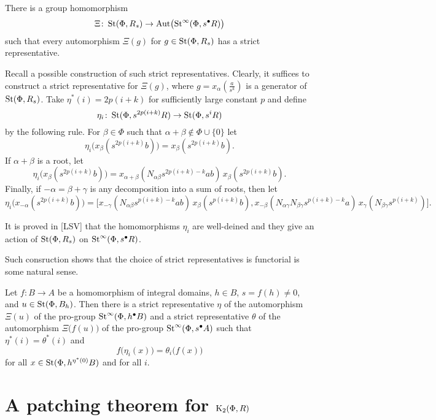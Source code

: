 \documentclass[oneside, 11pt]{amsart}
\begin{document}
\begin{theorem}[Voronetsky]
\label{vor}
There is a group homomorphism 
$$
\Xi \colon \mathop{\mathrm{St}}\nolimits(\Phi, R_s) \to \mathrm{Aut}\bigl(\mathop{\mathrm{St}}\nolimits^\infty(\Phi, s^\bullet R)\bigr)
$$
such that every automorphism $\Xi(g)$ for $g \in \mathop{\mathrm{St}}\nolimits(\Phi, R_s)$ has a strict representative.
\end{theorem}

Recall a possible construction of such strict representatives. Clearly, it suffices to construct a strict representative for \(\Xi(g)\), where $g = x_\alpha(\frac a {s^k})$ is a generator of $\mathop{\mathrm{St}}\nolimits(\Phi, R_s)$. Take $\eta^*(i) = 2p(i + k)$ for sufficiently large constant \(p\) and define
$$
\eta_i \colon \mathop{\mathrm{St}}\nolimits(\Phi, s^{2p(i + k)} R) \to \mathop{\mathrm{St}}\nolimits(\Phi, s^i R)
$$
by the following rule. For $\beta \in \Phi$ such that \(\alpha + \beta \notin \Phi \cup \{0\}\) let 
$$\eta_i \bigl(x_\beta(s^{2p(i + k)} b)\bigr) = x_\beta(s^{2p(i + k)}b).$$
If $\alpha + \beta$ is a root, let
$$
\eta_i\bigl(x_\beta(s^{2p(i + k)} b)\bigr) = x_{\alpha + \beta}(N_{\alpha \beta} s^{2p(i + k) - k} ab)\, x_\beta(s^{2p(i + k)} b).
$$
Finally, if $-\alpha = \beta + \gamma$ is any decomposition into a sum of roots, then let
$$
\eta_i\bigl(x_{-\alpha}(s^{2p(i + k)} b)\bigr) = \bigl[x_{-\gamma}(N_{\alpha\beta} s^{p(i + k) - k} ab)\,
x_\beta(s^{p(i + k)} b),
x_{-\beta}(N_{\alpha\gamma} N_{\beta\gamma} s^{p(i + k) - k} a)\,
x_\gamma(N_{\beta \gamma} s^{p(i + k)})\bigr].
$$

It is proved in [LSV] that the homomorphisms $\eta_i$ are well-deined and they give an action of $\mathop{\mathrm{St}}\nolimits(\Phi, R_s)$ on $\mathop{\mathrm{St}}\nolimits^\infty(\Phi, s^\bullet R)$.

Such consruction shows that the choice of strict representatives is functorial is some natural sense. 
\begin{corollary}
\label{vorcor}
Let $f \colon B \to A$ be a homomorphism of integral domains, $h \in B$, $s = f(h) \neq 0$, and $u \in \mathop{\mathrm{St}}\nolimits(\Phi, B_h)$. Then there is a strict representative $\eta$ of the automorphism $\Xi(u)$ of the pro-group $\mathop{\mathrm{St}}\nolimits^\infty(\Phi, h^\bullet B)$ and a strict representative $\theta$ of the automorphism $\Xi\bigl(f(u)\bigr)$ of the pro-group $\mathop{\mathrm{St}}\nolimits^\infty(\Phi, s^\bullet A)$ such that $\eta^*(i) = \theta^*(i)$ and
$$f\bigl(\eta_i(x)\bigr) = \theta_i\bigl(f(x)\bigr)$$
for all $x \in \mathop{\mathrm{St}}\nolimits(\Phi, h^{\eta^*(0)}B)$ and for all \(i\).
\end{corollary}

\section{A patching theorem for ${\mathrm{K}}_2(\Phi, R)$}
\end{document}
